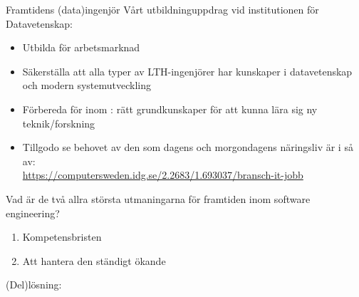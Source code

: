 \newcommand{\legend}[2][]{
    \begin{scope}[#1]
    \path
        \foreach \n/\s in {#2}
            {
                  ++(0,-10pt) node[\s,legend box] {} +(5pt,0) node[legend label] {\n}
            }
    ;
    \end{scope}
}


\ifkompendium\else




\begin{Slide}{Framtidens (data)ingenjör}
Vårt utbildninguppdrag vid institutionen för Datavetenskap:
\begin{itemize}
  \item Utbilda  för  arbetsmarknad
  \item Säkerställa att alla typer av LTH-ingenjörer har  kunskaper i datavetenskap och modern systemutveckling
  \item Förbereda för  inom : rätt grundkunskaper för att kunna lära sig ny teknik/forskning
  \item Tillgodo se behovet av den  som dagens och morgondagens näringsliv är i så  av: \\
  \url{https://computersweden.idg.se/2.2683/1.693037/bransch-it-jobb} \\
\end{itemize}
\end{Slide}

\begin{Slide}{Vad är de två allra största utmaningarna för framtiden inom software engineering?}
  \begin{enumerate}
    \item Kompetensbristen
    \item
    \pause Att hantera den ständigt ökande 
  \end{enumerate}
  \pause(Del)lösning: \pause {}
\end{Slide}


